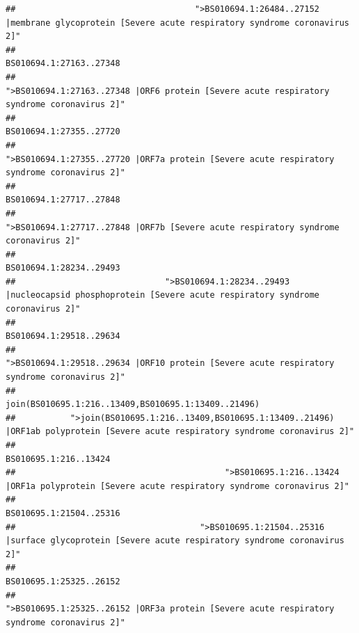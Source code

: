 \documentclass[
]{article}
\begin{document}
\begin{verbatim}
##                                    ">BS010694.1:26484..27152 |membrane glycoprotein [Severe acute respiratory syndrome coronavirus 2]" 
##                                                                                                                BS010694.1:27163..27348 
##                                             ">BS010694.1:27163..27348 |ORF6 protein [Severe acute respiratory syndrome coronavirus 2]" 
##                                                                                                                BS010694.1:27355..27720 
##                                            ">BS010694.1:27355..27720 |ORF7a protein [Severe acute respiratory syndrome coronavirus 2]" 
##                                                                                                                BS010694.1:27717..27848 
##                                                    ">BS010694.1:27717..27848 |ORF7b [Severe acute respiratory syndrome coronavirus 2]" 
##                                                                                                                BS010694.1:28234..29493 
##                              ">BS010694.1:28234..29493 |nucleocapsid phosphoprotein [Severe acute respiratory syndrome coronavirus 2]" 
##                                                                                                                BS010694.1:29518..29634 
##                                            ">BS010694.1:29518..29634 |ORF10 protein [Severe acute respiratory syndrome coronavirus 2]" 
##                                                                                    join(BS010695.1:216..13409,BS010695.1:13409..21496) 
##           ">join(BS010695.1:216..13409,BS010695.1:13409..21496) |ORF1ab polyprotein [Severe acute respiratory syndrome coronavirus 2]" 
##                                                                                                                  BS010695.1:216..13424 
##                                          ">BS010695.1:216..13424 |ORF1a polyprotein [Severe acute respiratory syndrome coronavirus 2]" 
##                                                                                                                BS010695.1:21504..25316 
##                                     ">BS010695.1:21504..25316 |surface glycoprotein [Severe acute respiratory syndrome coronavirus 2]" 
##                                                                                                                BS010695.1:25325..26152 
##                                            ">BS010695.1:25325..26152 |ORF3a protein [Severe acute respiratory syndrome coronavirus 2]" 

\end{verbatim}
\end{document}
